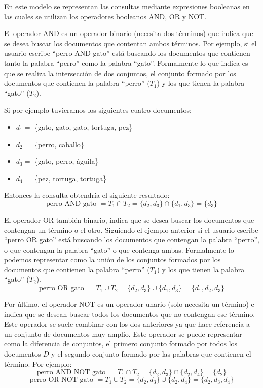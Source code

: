 \documentclass[size=a4, parskip=half, titlepage=false, toc=flat, toc=bib, 12pt]{scrartcl}
\theoremstyle{theorem-style}
\theoremstyle{definition-style}
\theoremstyle{remark-style}
\theoremstyle{example-style}
\theoremstyle{definition-style}
\theoremstyle{remark-style}
\begin{document}
En este modelo se representan las consultas mediante expresiones booleanas en las cuales se utilizan los operadores booleanos AND, OR y NOT.

El operador AND es un operador binario (necesita dos términos) que indica que se desea buscar los documentos que contentan ambos términos. Por ejemplo, si el usuario escribe ``perro AND gato'' está buscando los documentos que contienen tanto la palabra ``perro'' como la palabra ``gato''. Formalmente lo que indica es que se realiza la intersección de dos conjuntos, el conjunto formado por los documentos que contienen la palabra ``perro'' ($T_1$) y los que tienen la palabra ``gato'' ($T_2$).

Si por ejemplo tuvieramos los siguientes cuatro documentos:
\begin{itemize}
\item $d_1 = $ \{gato, gato, gato, tortuga, pez\}
\item $d_2 = $ \{perro, caballo\}
\item $d_3 = $ \{gato, perro, águila\}
\item $d_4 = $ \{pez, tortuga, tortuga\}
\end{itemize}
Entonces la consulta obtendría el siguiente resultado:
$$\textrm{perro AND gato } = T_1 \cap T_2 = \{d_2, d_3\} \cap \{d_1, d_3\} = \{d_3\}$$

El operador OR también binario, indica que se desea buscar los documentos que contengan un término o el otro. Siguiendo el ejemplo anterior si el usuario escribe ``perro OR gato'' está buscando los documentos que contengan la palabra ``perro'', o que contengan la palabra ``gato'' o que contenga ambas. Formalmente lo podemos representar como la unión de los conjuntos formados por los documentos que contienen la palabra ``perro'' ($T_1$) y los que tienen la palabra ``gato'' ($T_2$).
$$\textrm{perro OR gato } = T_1 \cup T_2 = \{d_2, d_3\} \cup \{d_1, d_3\} = \{d_1, d_2, d_3\}$$

Por último, el operador NOT es un operador unario (solo necesita un término) e indica que se desean buscar todos los documentos que no contengan ese término. Este operador se suele combinar con los dos anteriores ya que hace referencia a un conjunto de documentos muy amplio. Este operador se puede representar como la diferencia de conjuntos, el primero conjunto formado por todos los documentos $D$ y el segundo conjunto formado por las palabras que contienen el término. Por ejemplo:
$$\textrm{perro AND NOT gato } = T_1 \cap T_2 = \{d_2, d_3\} \cap \{d_2, d_4\} = \{d_2\}$$
$$\textrm{perro OR NOT gato } = T_1 \cup T_2 = \{d_2, d_3\} \cup \{d_2, d_4\} = \{d_2, d_3, d_4\}$$
\end{document}
